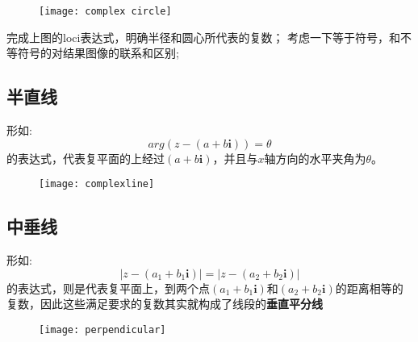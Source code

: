 \begin{figure}[H]
\centering
\texttt{[image: complex circle]}
\end{figure}

\begin{TaskBox}
完成上图的loci表达式，明确半径和圆心所代表的复数；
考虑一下等于符号，和不等符号的对结果图像的联系和区别;
\end{TaskBox}

\subsection*{半直线}
形如:
\[
	arg(z-(a+b\mathbf{i}))=\theta
\]
的表达式，代表复平面的上经过$(a+b\mathbf{i})$，并且与$x$轴方向的水平夹角为$\theta$。

\begin{figure}[H]
\centering
\texttt{[image: complexline]}
\end{figure}

\subsection*{中垂线}
形如:
\[
	|z-(a_1+b_1\mathbf{i})| = |z-(a_2+b_2\mathbf{i})|
\]
的表达式，则是代表复平面上，到两个点$(a_1+b_1\mathbf{i})$和$(a_2+b_2\mathbf{i})$的距离相等的复数，因此这些满足要求的复数其实就构成了线段的\textbf{垂直平分线}

\begin{figure}[H]
\centering
\texttt{[image: perpendicular]}
\end{figure}

